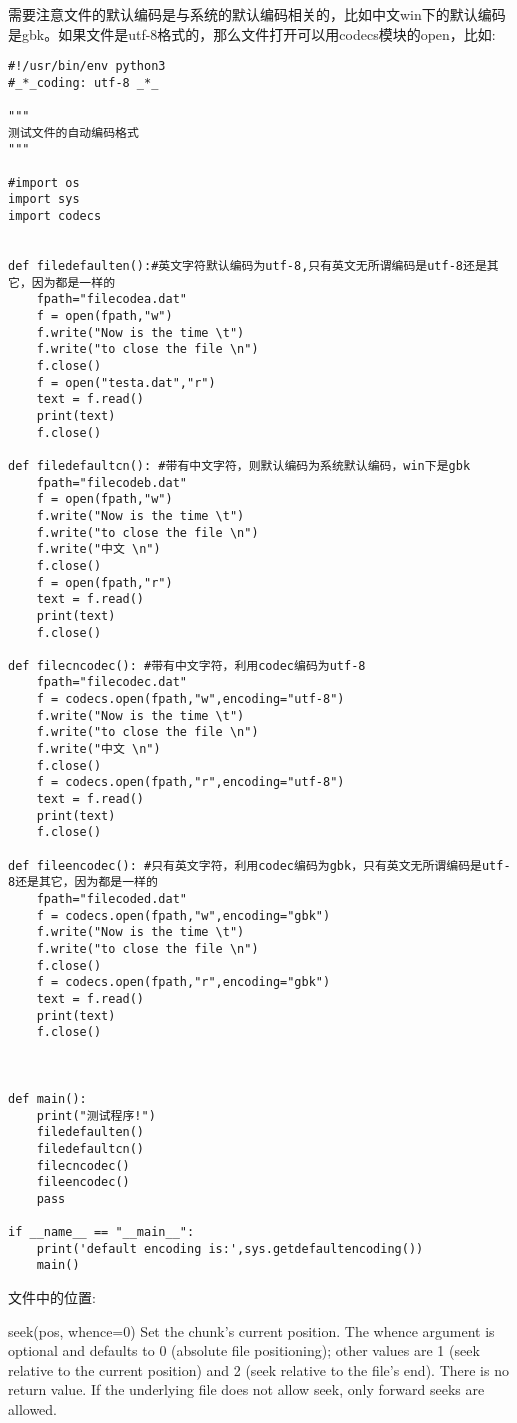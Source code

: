 \documentclass[twoside,11pt]{book}
\begin{document}
需要注意文件的默认编码是与系统的默认编码相关的，比如中文win下的默认编码是gbk。如果文件是utf-8格式的，那么文件打开可以用codecs模块的open，比如:
\begin{lstlisting}
#!/usr/bin/env python3
#_*_coding: utf-8 _*_

"""
测试文件的自动编码格式
"""

#import os
import sys
import codecs


def filedefaulten():#英文字符默认编码为utf-8,只有英文无所谓编码是utf-8还是其它，因为都是一样的
    fpath="filecodea.dat"
    f = open(fpath,"w")
    f.write("Now is the time \t")
    f.write("to close the file \n")
    f.close()
    f = open("testa.dat","r")
    text = f.read()
    print(text)
    f.close()

def filedefaultcn(): #带有中文字符，则默认编码为系统默认编码，win下是gbk
    fpath="filecodeb.dat"
    f = open(fpath,"w")
    f.write("Now is the time \t")
    f.write("to close the file \n")
    f.write("中文 \n")
    f.close()
    f = open(fpath,"r")
    text = f.read()
    print(text)
    f.close()

def filecncodec(): #带有中文字符，利用codec编码为utf-8
    fpath="filecodec.dat"
    f = codecs.open(fpath,"w",encoding="utf-8")
    f.write("Now is the time \t")
    f.write("to close the file \n")
    f.write("中文 \n")
    f.close()
    f = codecs.open(fpath,"r",encoding="utf-8")
    text = f.read()
    print(text)
    f.close()

def fileencodec(): #只有英文字符，利用codec编码为gbk，只有英文无所谓编码是utf-8还是其它，因为都是一样的
    fpath="filecoded.dat"
    f = codecs.open(fpath,"w",encoding="gbk")
    f.write("Now is the time \t")
    f.write("to close the file \n")
    f.close()
    f = codecs.open(fpath,"r",encoding="gbk")
    text = f.read()
    print(text)
    f.close()



def main():
    print("测试程序!")
    filedefaulten()
    filedefaultcn()
    filecncodec()
    fileencodec()
    pass

if __name__ == "__main__":
    print('default encoding is:',sys.getdefaultencoding())
    main()

\end{lstlisting}


文件中的位置:

seek(pos, whence=0)
Set the chunk’s current position. The whence argument is optional and defaults to 0 (absolute file positioning); other values are 1 (seek relative to the current position) and 2 (seek relative to the file’s end). There is no return value. If the underlying file does not allow seek, only forward seeks are allowed.
\end{document}
